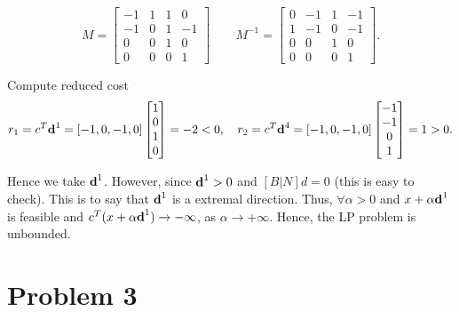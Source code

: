 \documentclass[12pt]{article}
\begin{document}
\begin{enumerate}
$$
M = \begin{bmatrix}
-1 & 1 & 1 & 0 \\
-1 & 0 & 1 & -1 \\
0 & 0 & 1 & 0 \\
0 & 0 & 0 & 1
\end{bmatrix} \qquad M^{-1} = \begin{bmatrix}
0 & -1 & 1 & -1 \\
1 & -1 & 0 & -1 \\
0 & 0 & 1 & 0 \\
0 & 0 & 0 & 1
\end{bmatrix}.
$$

Compute reduced cost 
$$
r_1 = c^T\textbf d^1 = [-1, 0, -1, 0]\begin{bmatrix}
1\\0\\1\\0
\end{bmatrix} = -2 < 0, \quad r_2= c^T\textbf d^4 = [-1, 0, -1, 0]\begin{bmatrix}
-1\\-1\\0\\1
\end{bmatrix} = 1 > 0.
$$

Hence we take $\textbf d^1$. However, since $\textbf d^1 > 0$ and $[B|N]d = 0$ (this is easy to check). This is to say that $\textbf d^1$ is a extremal direction. Thus, $\forall \alpha > 0$ and $x + \alpha \textbf d^1$ is feasible and $c^T(x + \alpha \textbf d^1)\rightarrow -\infty$, as $\alpha \rightarrow +\infty$. Hence, the LP problem is unbounded.

\end{enumerate}

\section*{Problem 3}
\end{document}
